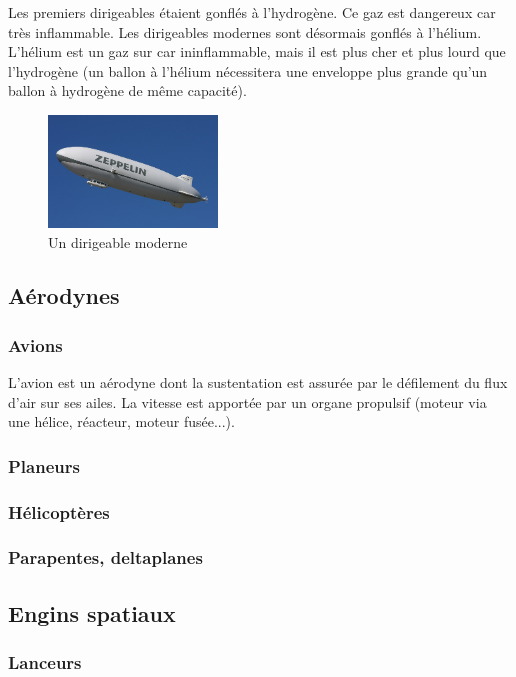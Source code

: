 	Les premiers dirigeables étaient gonflés à l'hydrogène. Ce gaz est dangereux car très inflammable. Les dirigeables modernes sont désormais gonflés à l'hélium. L'hélium est un gaz sur car ininflammable, mais il est plus cher et plus lourd que l'hydrogène (un ballon à l'hélium nécessitera une enveloppe plus grande qu'un ballon à hydrogène de même capacité).
	
	\begin{figure}[H]
  	\centering
    \includegraphics[width=0.4\textwidth]{1-EtudeAeronefs/img/dirigeable.jpg}
  	\caption{Un dirigeable moderne \cite{img:dirigeable}}
	\end{figure}	

\subsection{Aérodynes}
	\subsubsection{Avions}
	L'avion est un aérodyne dont la sustentation est assurée par le défilement du flux d'air sur ses ailes. La vitesse est apportée par un organe propulsif (moteur via une hélice, réacteur, moteur fusée...).
	
	\subsubsection{Planeurs}
	\subsubsection{Hélicoptères}
	\subsubsection{Parapentes, deltaplanes}

\subsection{Engins spatiaux}
	\subsubsection{Lanceurs}
